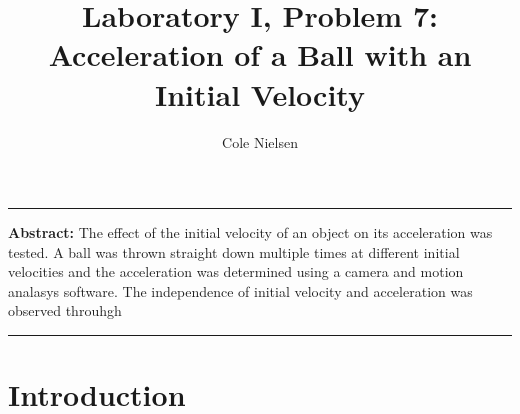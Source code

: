 \documentclass[12pt, letterpaper]{article}
\renewenvironment{abstract}{%
\hfill\begin{minipage}{0.95\textwidth}
\rule{\textwidth}{1pt}}
{\par\noindent\rule{\textwidth}{1pt}\end{minipage}}
\begin{document}
%
\title{Laboratory I, Problem 7: Acceleration of a Ball with an Initial Velocity}
\author[]{Cole Nielsen}
%
\maketitle
%
\begin{abstract}
\textbf{Abstract:} The effect of the initial velocity of an object on its acceleration was tested. A ball was thrown straight down multiple times at different initial velocities and the acceleration was determined using a camera and motion analasys software. The independence of initial velocity and acceleration was observed throuhgh 
\end{abstract}
\section{Introduction}
\lipsum
\end{document}
